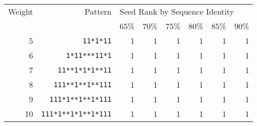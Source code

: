 \documentclass{llncs}
\begin{document}
\begin{table}[h!]
  \centering
\begin{tabular}{|r|r|r|r|r|r|r|r|}
\hline Weight & Pattern &\multicolumn{6}{l|}{Seed Rank by Sequence Identity} \\
\cline{3-8}
&&65\% & 70\% & 75\% & 80\% & 85\% & 90\% \\
\hline\hline

5 & \texttt{11*1*11}   & 1 & 1 & 1 & 1 & 1 & 1 \\
\hline
6 & \texttt{1*11***11*1} & 1 & 1 & 1 & 1 & 1 & 1 \\
\hline
7 & \texttt{11**1*1*1**11} & 1 & 1 & 1 & 1 & 1 & 1 \\
\hline
8 & \texttt{111**1**1**111} & 1 & 1 & 1 & 1 & 1 & 1 \\
\hline
9 & \texttt{111*1**1**1*111} & 1 & 1 & 1 & 1 & 1 & 1 \\
\hline
10 & \texttt{111*1**1*1**1*111}  & 1 & 1 & 1 & 1 & 1 & 1 \\

\end{tabular}
\end{table}
\end{document}
